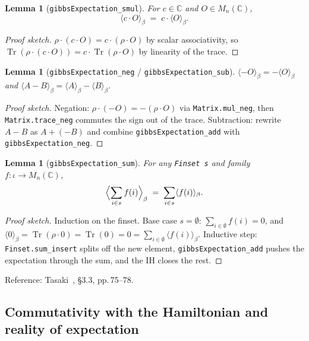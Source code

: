 \documentclass[a4paper,11pt]{article}
\newtheorem{lemma}[theorem]{Lemma}
\begin{document}
\begin{lemma}[\texttt{gibbsExpectation\_smul}]
For $c \in \mathbb{C}$ and $O \in M_n(\mathbb{C})$,
\[
  \langle c \cdot O \rangle_\beta
  \;=\;
  c \cdot \langle O \rangle_\beta.
\]
\end{lemma}

\begin{proof}[Proof sketch]
$\rho \cdot (c \cdot O) = c \cdot (\rho \cdot O)$ by scalar associativity,
so $\operatorname{Tr}(\rho \cdot (c \cdot O))
   = c \cdot \operatorname{Tr}(\rho \cdot O)$
by linearity of the trace.
\end{proof}

\begin{lemma}[\texttt{gibbsExpectation\_neg} / \texttt{gibbsExpectation\_sub}]
$\langle -O \rangle_\beta = -\langle O \rangle_\beta$
and $\langle A - B \rangle_\beta
     = \langle A \rangle_\beta - \langle B \rangle_\beta$.
\end{lemma}

\begin{proof}[Proof sketch]
Negation: $\rho \cdot (-O) = -(\rho \cdot O)$ via
\texttt{Matrix.mul\_neg}, then \texttt{Matrix.trace\_neg} commutes the
sign out of the trace.  Subtraction: rewrite $A - B$ as $A + (-B)$ and
combine \texttt{gibbsExpectation\_add} with \texttt{gibbsExpectation\_neg}.
\end{proof}

\begin{lemma}[\texttt{gibbsExpectation\_sum}]
For any \texttt{Finset s} and family $f : \iota \to M_n(\mathbb{C})$,
\[
  \Bigl\langle \sum_{i \in s} f(i) \Bigr\rangle_\beta
  \;=\; \sum_{i \in s} \langle f(i) \rangle_\beta.
\]
\end{lemma}

\begin{proof}[Proof sketch]
Induction on the finset.  Base case $s = \emptyset$:
$\sum_{i \in \emptyset} f(i) = 0$, and
$\langle 0 \rangle_\beta
 = \operatorname{Tr}(\rho \cdot 0) = \operatorname{Tr}(0) = 0
 = \sum_{i \in \emptyset} \langle f(i) \rangle_\beta$.
Inductive step: \texttt{Finset.sum\_insert} splits off the new element,
\texttt{gibbsExpectation\_add} pushes the expectation through the sum,
and the IH closes the rest.
\end{proof}

Reference: Tasaki~\cite{Tasaki:QMB}, §3.3, pp.\,75--78.

\subsection{Commutativity with the Hamiltonian and reality of expectation}
\label{subsec:gibbs-commute-real}
\end{document}
